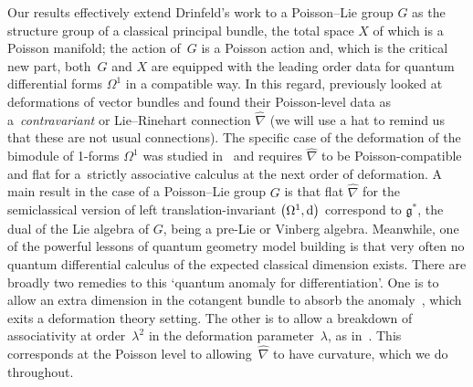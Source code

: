 \documentclass[pdftex]{sigma}
\numberwithin{equation}{section}
\newcommand{\<}{{\langle}}
\renewcommand{\>}{{\rangle}}
\newcommand{\extd}{{\rm d}}
\newcommand{\cg}{{\mathfrak{g}}}
\begin{document}
Our results effectively extend Drinfeld's work to a Poisson--Lie group $G$ as the structure group of a classical principal bundle, the total space $X$ of which is a Poisson manifold; the action of~$G$ is a Poisson action and, which is the critical new part, both~$G$ and $X$ are equipped with the leading order data for quantum differential forms $\Omega^1$ in a compatible way. In this regard, \cite{Bur,Fer,Hue} previously looked at deformations of vector bundles and found their Poisson-level data as a~{\em contravariant} or Lie--Rinehart connection $\hat\nabla$ (we will use a hat to remind us that these are not usual connections). The specific case of the deformation of the bimodule of 1-forms $\Omega^1$ was studied in~\cite{BegMa:sem, BegMa:twi, Haw} and requires $\hat\nabla$ to be Poisson-compatible and flat for a~strictly associative calculus at the next order of deformation. A main result \cite[Corollary~4.2]{MaTao:plg} in the case of a Poisson--Lie group $G$ is that flat $\hat\nabla$ for the semiclassical version of left translation-invariant $\big(\Omega^1,\extd\big)$ correspond to $\cg^*$, the dual of the Lie algebra of $G$, being a pre-Lie or Vinberg algebra. Meanwhile, one of the powerful lessons of quantum geometry model building is that very often no quantum differential calculus of the expected classical dimension exists. There are broadly two remedies to this `quantum anomaly for differentiation'. One is to allow an extra dimension in the cotangent bundle to absorb the anomaly~\cite{Ma:spo,Ma:rec}, which exits a deformation theory setting. The other is to allow a breakdown of associativity at order~$\lambda^2$ in the deformation parameter~$\lambda$, as in~\cite{BegMa:sem, BegMa:twi}. This corresponds at the Poisson level to allowing~$\hat\nabla$ to have curvature, which we do throughout.
\end{document}
